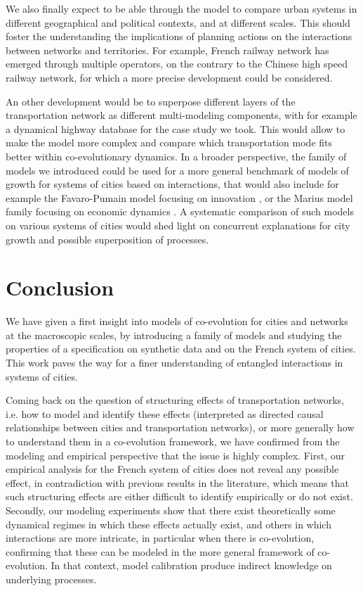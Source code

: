 \documentclass[11pt]{article}
\begin{document}
We also finally expect to be able through the model to compare urban systems in different geographical and political contexts, and at different scales. This should foster the understanding the implications of planning actions on the interactions between networks and territories. For example, French railway network has emerged through multiple operators, on the contrary to the Chinese high speed railway network, for which a more precise development could be considered.


An other development would be to superpose different layers of the transportation network as different multi-modeling components, with for example a dynamical highway database for the case study we took. This would allow to make the model more complex and compare which transportation mode fits better within co-evolutionary dynamics. In a broader perspective, the family of models we introduced could be used for a more general benchmark of models of growth for systems of cities based on interactions, that would also include for example the Favaro-Pumain model focusing on innovation \citep{favaro2011gibrat}, or the Marius model family focusing on economic dynamics \citep{cottineau2014evolution}. A systematic comparison of such models on various systems of cities would shed light on concurrent explanations for city growth and possible superposition of processes.


\section*{Conclusion}

We have given a first insight into models of co-evolution for cities and networks at the macroscopic scales, by introducing a family of models and studying the properties of a specification on synthetic data and on the French system of cities. This work paves the way for a finer understanding of entangled interactions in systems of cities.

Coming back on the question of structuring effects of transportation networks, i.e. how to model and identify these effects (interpreted as directed causal relationships between cities and transportation networks), or more generally how to understand them in a co-evolution framework, we have confirmed from the modeling and empirical perspective that the issue is highly complex. First, our empirical analysis for the French system of cities does not reveal any possible effect, in contradiction with previous results in the literature, which means that such structuring effects are either difficult to identify empirically or do not exist. Secondly, our modeling experiments show that there exist theoretically some dynamical regimes in which these effects actually exist, and others in which interactions are more intricate, in particular when there is co-evolution, confirming that these can be modeled in the more general framework of co-evolution. In that context, model calibration produce indirect knowledge on underlying processes.
\end{document}
